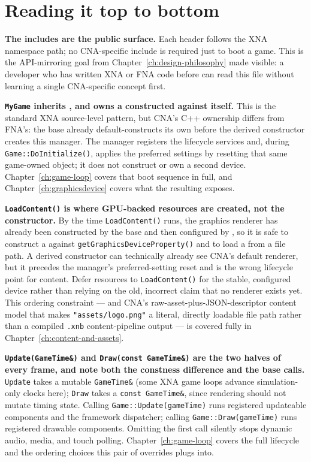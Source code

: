 \section{Reading it top to bottom}

\textbf{The includes are the public surface.} Each header follows the XNA namespace path; no CNA-specific include is
required just to boot a game. This is the API-mirroring goal from
Chapter~\ref{ch:design-philosophy} made visible: a developer who has written XNA or FNA code
before can read this file without learning a single CNA-specific concept first.

\textbf{\texttt{MyGame} inherits , and owns a
 constructed against itself.} This is the standard XNA
source-level pattern, but CNA's C++ ownership differs from FNA's: the  base
already default-constructs its own  before the derived constructor
creates this manager. The manager registers the lifecycle services and, during
\texttt{Game::DoInitialize()}, applies the preferred settings by resetting that same game-owned
object; it does not construct or own a second device. Chapter~\ref{ch:game-loop} covers that
boot sequence in full, and Chapter~\ref{ch:graphicsdevice} covers what the resulting
 exposes.

\textbf{\texttt{LoadContent()} is where GPU-backed resources are created, not the
constructor.} By the time \texttt{LoadContent()} runs, the graphics renderer has already been
constructed by the base  and then configured by
, so it is safe to construct a  against
\texttt{getGraphicsDeviceProperty()} and to load a  from a file path. A
derived constructor can technically already see CNA's default renderer, but it precedes the
manager's preferred-setting reset and is the wrong lifecycle point for content. Defer resources
to \texttt{LoadContent()} for the stable, configured device rather than relying on the old,
incorrect claim that no renderer exists yet. This ordering constraint --- and CNA's
raw-asset-plus-JSON-descriptor content model that makes
\texttt{"assets/logo.png"} a literal, directly loadable file path rather than a compiled
\texttt{.xnb} content-pipeline output --- is covered fully in
Chapter~\ref{ch:content-and-assets}.

\textbf{\texttt{Update(GameTime\&)} and \texttt{Draw(const GameTime\&)} are the two halves of
every frame, and note both the constness difference and the base calls.} \texttt{Update} takes a mutable
\texttt{GameTime\&} (some XNA game loops advance simulation-only clocks here);
\texttt{Draw} takes a \texttt{const GameTime\&}, since rendering should not mutate timing
state. Calling \texttt{Game::Update(gameTime)} runs registered updateable components and the
framework dispatcher; calling \texttt{Game::Draw(gameTime)} runs registered drawable components.
Omitting the first call silently stops dynamic audio, media, and touch polling. Chapter~\ref{ch:game-loop}
covers the full lifecycle and the ordering choices this pair of overrides plugs into.

